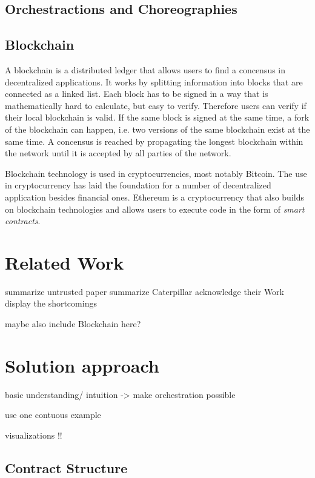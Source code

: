\documentclass[runningheads]{llncs}
\begin{document}
\subsection{Orchestractions and Choreographies}

\subsection{Blockchain}
A blockchain is a distributed ledger that allows users to find a concensus in decentralized applications.
It works by splitting information into blocks that are connected as a linked list. 
Each block has to be signed in a way that is mathematically hard to calculate, but easy to verify.
Therefore users can verify if their local blockchain is valid.
If the same block is signed at the same time, a fork of the blockchain can happen, i.e. two versions of the same blockchain exist at the same time.
A concensus is reached by propagating the longest blockchain within the network until it is accepted by all parties of the network.

Blockchain technology is used in cryptocurrencies, most notably Bitcoin.
The use in cryptocurrency has laid the foundation for a number of decentralized application besides financial ones.
Ethereum is a cryptocurrency that also builds on blockchain technologies and allows users to execute code in the form of \emph{smart contracts}.


\section{Related Work}

summarize untrusted paper
summarize Caterpillar
acknowledge their Work
display the shortcomings

maybe also include Blockchain here? 

\section{Solution approach}

basic understanding/ intuition
-> make orchestration possible

use one contuous example

visualizations !!

\subsection{Contract Structure}
\end{document}
